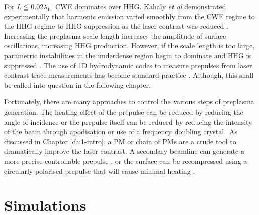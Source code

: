 For $L \leqq 0.02 \lambda_\mathrm{L}$, \ac{CWE} dominates over HHG. Kahaly \textit{et al} demonstrated experimentally that harmonic emission varied smoothly from the CWE regime to the HHG regime to HHG suppression as the laser contrast was reduced  \cite{kahalyDirectObservationDensityGradient2013}. Increasing the preplasma scale length increases the amplitude of surface oscillations, increasing HHG production. However, if the scale length is too large, parametric instabilities in the underdense region begin to dominate and HHG is suppressed \cite{dollarScalingHighorderHarmonic2013}. The use of 1D hydrodynamic codes to measure prepulses from laser contrast trace measurements has become standard practice \cite{behmkeControllingSpacingAttosecond2011, dollarScalingHighorderHarmonic2013, liExperimentalDemonstrationEfficient2022}. Although, this shall be called into question in the following chapter.

Fortunately, there are many approaches to control the various steps of preplasma generation. The heating effect of the prepulse can be reduced by reducing the angle of incidence or the prepulse itself can be reduced by reducing the intensity of the beam through apodisation or use of a frequency doubling crystal. As discussed in Chapter \ref{ch:1-intro}, a PM or chain of PMs are a crude tool to dramatically improve the laser contrast. A secondary beamline can generate a more precise controllable prepulse \cite{kahalyDirectObservationDensityGradient2013}, or the surface can be recompressed using a circularly polarised prepulse that will cause minimal heating \cite{liExperimentalDemonstrationEfficient2022}.

\section{\label{ch:3-sec:simulations}Simulations}
